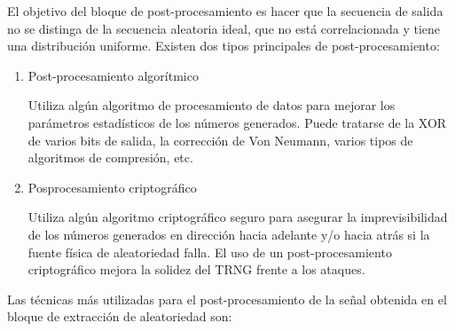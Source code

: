 	
	El objetivo del bloque de post-procesamiento es hacer que la secuencia de salida no se distinga de la secuencia aleatoria ideal, que no está correlacionada y tiene una distribución uniforme. Existen dos tipos principales de post-procesamiento:
	
	\begin{enumerate}
		\item Post-procesamiento algorítmico
		
		Utiliza algún algoritmo de procesamiento de datos para mejorar los parámetros estadísticos de los números generados. Puede tratarse de la XOR de varios bits de salida, la corrección de Von Neumann, varios tipos de algoritmos de compresión, etc.
		
		\item Posprocesamiento criptográfico 
		
		Utiliza algún algoritmo criptográfico seguro para asegurar la imprevisibilidad de los números generados en dirección hacia adelante y/o hacia atrás si la fuente física de aleatoriedad falla. El uso de un post-procesamiento criptográfico mejora la solidez del TRNG frente a los ataques.
	\end{enumerate}
		
	Las técnicas más utilizadas para el post-procesamiento de la señal obtenida en el bloque de extracción de aleatoriedad son: 
	
